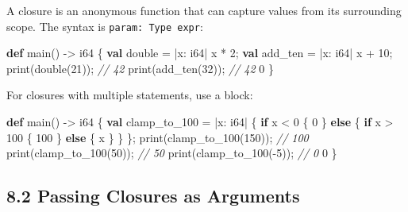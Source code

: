 \documentclass[
  english,
]{book}
\newenvironment{Shaded}{\begin{snugshade}}{\end{snugshade}}
\newcommand{\CommentTok}[1]{\textcolor[rgb]{0.42,0.60,0.33}{\textit{#1}}}
\newcommand{\ControlFlowTok}[1]{\textcolor[rgb]{0.77,0.53,0.75}{\textbf{#1}}}
\newcommand{\DataTypeTok}[1]{\textcolor[rgb]{0.31,0.79,0.69}{#1}}
\newcommand{\DecValTok}[1]{\textcolor[rgb]{0.71,0.81,0.66}{#1}}
\newcommand{\FunctionTok}[1]{\textcolor[rgb]{0.86,0.86,0.67}{#1}}
\newcommand{\KeywordTok}[1]{\textcolor[rgb]{0.34,0.61,0.84}{\textbf{#1}}}
\newcommand{\NormalTok}[1]{\textcolor[rgb]{0.83,0.83,0.83}{#1}}
\newcommand{\OperatorTok}[1]{\textcolor[rgb]{0.83,0.83,0.83}{#1}}
\begin{document}
A closure is an anonymous function that can capture values from its
surrounding scope. The syntax is
\texttt{\textbar{}param:\ Type\textbar{}\ expr}:

\begin{Shaded}
\begin{Highlighting}[]
\KeywordTok{def}\NormalTok{ main() }\OperatorTok{{-}\textgreater{}} \DataTypeTok{i64}\NormalTok{ \{}
    \KeywordTok{val}\NormalTok{ double }\OperatorTok{=} \OperatorTok{|}\NormalTok{x: }\DataTypeTok{i64}\OperatorTok{|}\NormalTok{ x }\OperatorTok{*} \DecValTok{2}\NormalTok{;}
    \KeywordTok{val}\NormalTok{ add\_ten }\OperatorTok{=} \OperatorTok{|}\NormalTok{x: }\DataTypeTok{i64}\OperatorTok{|}\NormalTok{ x }\OperatorTok{+} \DecValTok{10}\NormalTok{;}
    \FunctionTok{print}\NormalTok{(double(}\DecValTok{21}\NormalTok{));    }\CommentTok{// 42}
    \FunctionTok{print}\NormalTok{(add\_ten(}\DecValTok{32}\NormalTok{));   }\CommentTok{// 42}
    \DecValTok{0}
\NormalTok{\}}
\end{Highlighting}
\end{Shaded}

For closures with multiple statements, use a block:

\begin{Shaded}
\begin{Highlighting}[]
\KeywordTok{def}\NormalTok{ main() }\OperatorTok{{-}\textgreater{}} \DataTypeTok{i64}\NormalTok{ \{}
    \KeywordTok{val}\NormalTok{ clamp\_to\_100 }\OperatorTok{=} \OperatorTok{|}\NormalTok{x: }\DataTypeTok{i64}\OperatorTok{|}\NormalTok{ \{}
        \ControlFlowTok{if}\NormalTok{ x }\OperatorTok{\textless{}} \DecValTok{0}\NormalTok{ \{}
            \DecValTok{0}
\NormalTok{        \} }\ControlFlowTok{else}\NormalTok{ \{}
            \ControlFlowTok{if}\NormalTok{ x }\OperatorTok{\textgreater{}} \DecValTok{100}\NormalTok{ \{}
                \DecValTok{100}
\NormalTok{            \} }\ControlFlowTok{else}\NormalTok{ \{}
\NormalTok{                x}
\NormalTok{            \}}
\NormalTok{        \}}
\NormalTok{    \};}
    \FunctionTok{print}\NormalTok{(clamp\_to\_100(}\DecValTok{150}\NormalTok{));   }\CommentTok{// 100}
    \FunctionTok{print}\NormalTok{(clamp\_to\_100(}\DecValTok{50}\NormalTok{));    }\CommentTok{// 50}
    \FunctionTok{print}\NormalTok{(clamp\_to\_100(}\OperatorTok{{-}}\DecValTok{5}\NormalTok{));    }\CommentTok{// 0}
    \DecValTok{0}
\NormalTok{\}}
\end{Highlighting}
\end{Shaded}

\subsection{8.2 Passing Closures as
Arguments}\label{passing-closures-as-arguments}
\end{document}
